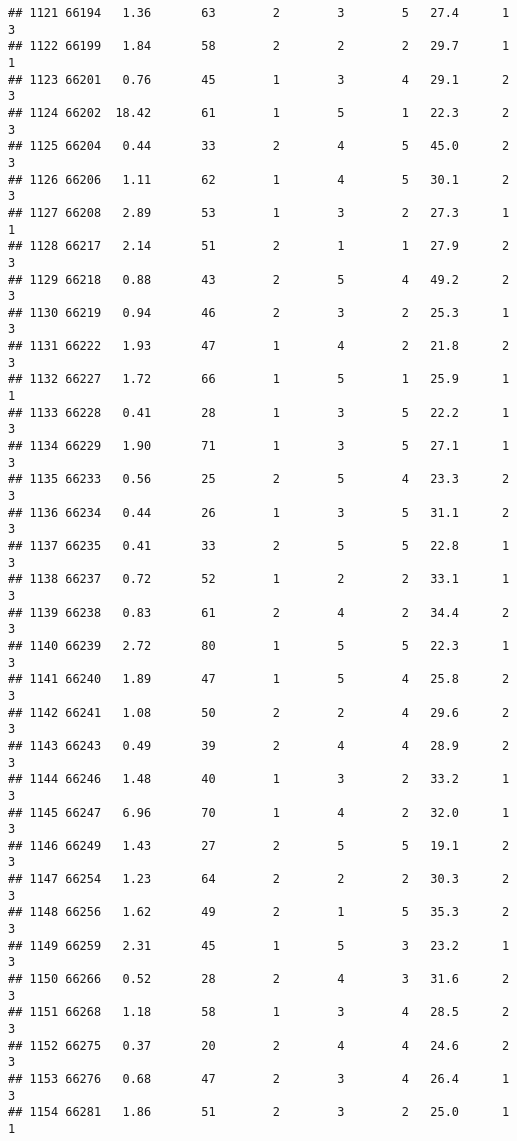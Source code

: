 \documentclass[
]{article}
\begin{document}
\begin{verbatim}
## 1121 66194   1.36       63        2        3        5   27.4      1      3
## 1122 66199   1.84       58        2        2        2   29.7      1      1
## 1123 66201   0.76       45        1        3        4   29.1      2      3
## 1124 66202  18.42       61        1        5        1   22.3      2      3
## 1125 66204   0.44       33        2        4        5   45.0      2      3
## 1126 66206   1.11       62        1        4        5   30.1      2      3
## 1127 66208   2.89       53        1        3        2   27.3      1      1
## 1128 66217   2.14       51        2        1        1   27.9      2      3
## 1129 66218   0.88       43        2        5        4   49.2      2      3
## 1130 66219   0.94       46        2        3        2   25.3      1      3
## 1131 66222   1.93       47        1        4        2   21.8      2      3
## 1132 66227   1.72       66        1        5        1   25.9      1      1
## 1133 66228   0.41       28        1        3        5   22.2      1      3
## 1134 66229   1.90       71        1        3        5   27.1      1      3
## 1135 66233   0.56       25        2        5        4   23.3      2      3
## 1136 66234   0.44       26        1        3        5   31.1      2      3
## 1137 66235   0.41       33        2        5        5   22.8      1      3
## 1138 66237   0.72       52        1        2        2   33.1      1      3
## 1139 66238   0.83       61        2        4        2   34.4      2      3
## 1140 66239   2.72       80        1        5        5   22.3      1      3
## 1141 66240   1.89       47        1        5        4   25.8      2      3
## 1142 66241   1.08       50        2        2        4   29.6      2      3
## 1143 66243   0.49       39        2        4        4   28.9      2      3
## 1144 66246   1.48       40        1        3        2   33.2      1      3
## 1145 66247   6.96       70        1        4        2   32.0      1      3
## 1146 66249   1.43       27        2        5        5   19.1      2      3
## 1147 66254   1.23       64        2        2        2   30.3      2      3
## 1148 66256   1.62       49        2        1        5   35.3      2      3
## 1149 66259   2.31       45        1        5        3   23.2      1      3
## 1150 66266   0.52       28        2        4        3   31.6      2      3
## 1151 66268   1.18       58        1        3        4   28.5      2      3
## 1152 66275   0.37       20        2        4        4   24.6      2      3
## 1153 66276   0.68       47        2        3        4   26.4      1      3
## 1154 66281   1.86       51        2        3        2   25.0      1      1

\end{verbatim}
\end{document}
